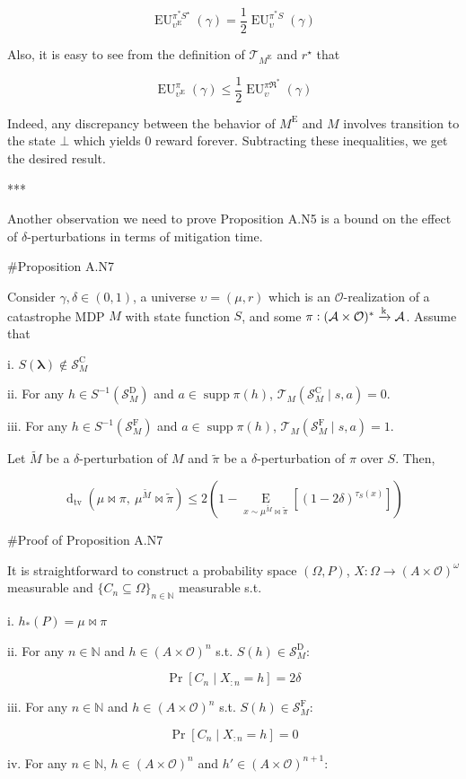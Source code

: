 \documentclass[a4paper]{article}
\DeclareMathOperator{\Supp}{supp}
\newcommand{\AP}[1]{\left(#1\right)}
\newcommand{\AB}[1]{\left[#1\right]}
\newcommand{\Pa}[2]{\underset{#1}{\operatorname{Pr}}\AB{#2}}
\newcommand{\Ea}[2]{\underset{#1}{\operatorname{E}}\AB{#2}}
\newcommand{\Dtva}[1]{\operatorname{d}_{\text{tv}}\AP{#1}}
\newcommand{\Nats}{\mathbb{N}}
\newcommand{\Sq}[2]{\{#1\}_{#2 \in \Nats}}
\newcommand{\Sqn}[1]{\Sq{#1}{n}}
\newcommand{\Estr}{\boldsymbol{\lambda}}
\newcommand{\M}{\xrightarrow{\textnormal{k}}}
\newcommand{\Ob}{\mathcal{O}}
\newcommand{\A}{\mathcal{A}}
\newcommand{\St}{\mathcal{S}}
\newcommand{\T}{\mathcal{T}}
\newcommand{\FH}{(\A \times \Ob)^*}
\newcommand{\RMC}{\mathrm{C}}
\newcommand{\RMD}{\mathrm{D}}
\newcommand{\RME}{\mathrm{E}}
\newcommand{\RMF}{\mathrm{F}}
\newcommand{\SF}{\St^{\RMF}}
\newcommand{\SD}{\St^{\RMD}}
\newcommand{\SC}{\St^{\RMC}}
\newcommand{\ME}{M^{\RME}}
\newcommand{\EU}{\operatorname{EU}}
\begin{document}
$$\EU_{\upsilon^\RME}^{\pi^* S^\star}(\gamma) = \frac{1}{2}\EU_{\upsilon}^{\pi^* S}(\gamma)$$

Also, it is easy to see from the definition of $\T_{\ME}$ and $r^\star$ that

$$\EU_{\upsilon^\RME}^{\pi}(\gamma) \leq \frac{1}{2}\EU_{\upsilon}^{\pi\Re^*}(\gamma)$$

Indeed, any discrepancy between the behavior of $\ME$ and $M$ involves transition to the state $\bot$ which yields 0 reward forever. Subtracting these inequalities, we get the desired result.

***

Another observation we need to prove Proposition A.N5 is a bound on the effect of $\delta$-perturbations in terms of mitigation time.

\#Proposition A.N7

Consider $\gamma,\delta\in(0,1)$, a universe $\upsilon=(\mu,r)$ which is an $\Ob$-realization of a catastrophe MDP $M$ with state function $S$, and some $\pi: \FH \M \A$. Assume that 

i. $S(\Estr) \not\in \SC_M$

ii. For any $h \in S^{-1}\AP{\SD_M}$ and $a \in \Supp{\pi(h)}$, $\T_M\AP{\SC_M \mid s,a} = 0$.

iii. For any $h \in S^{-1}\AP{\SF_M}$ and $a \in \Supp{\pi(h)}$, $\T_M\AP{\SF_M \mid s,a} = 1$. 

Let $\tilde{M}$ be a $\delta$-perturbation of $M$ and $\tilde{\pi}$ be a $\delta$-perturbation of $\pi$ over $S$. Then,

$$\Dtva{\mu\bowtie\pi,\ \mu^{\tilde{M}}\bowtie\tilde{\pi}} \leq 2\AP{1-\Ea{x\sim\mu^{\tilde{M}}\bowtie\tilde{\pi}}{\AP{1-2\delta}^{\tau_S(x)}}}$$

\#Proof of Proposition A.N7

It is straightforward to construct a probability space $(\Omega,P)$, $X: \Omega \rightarrow (A \times \Ob)^\omega$ measurable and $\Sqn{C_n \subseteq \Omega}$ measurable s.t.

i. $h_*(P) = \mu\bowtie\pi$

ii. For any $n \in \Nats$ and $h \in (A \times \Ob)^n$ s.t. $S(h) \in \SD_M$: 

$$\Pa{}{C_n \mid X_{:n} = h} = 2\delta$$

iii. For any $n \in \Nats$ and $h \in (A \times \Ob)^n$ s.t. $S(h) \in \SF_M$: 

$$\Pa{}{C_n \mid X_{:n} = h} = 0$$

iv. For any $n \in \Nats$, $h \in (A \times \Ob)^n$ and $h' \in (A \times \Ob)^{n+1}$:
\end{document}
